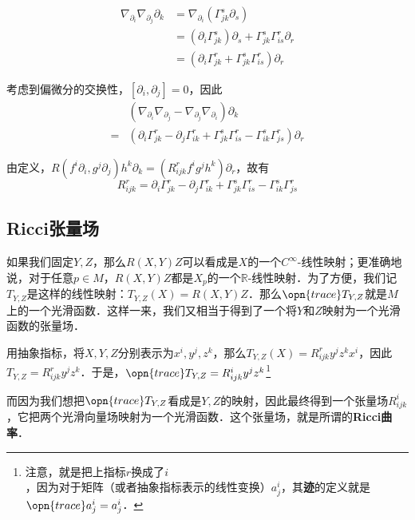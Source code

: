 \begin{equation}
\begin{aligned}
\nabla_{\partial_i}\nabla_{\partial_j}\partial_k&=\nabla_{\partial_i}(\Gamma^s_{jk}\partial_s)\\
&=(\partial_i\Gamma^s_{jk})\partial_s+\Gamma^s_{jk}\Gamma^r_{is}\partial_r\\
&=(\partial_i\Gamma^r_{jk}+\Gamma^s_{jk}\Gamma^r_{is})\partial_r
\end{aligned}
\end{equation}


考虑到偏微分的交换性，$[\partial_i, \partial_j]=0$，因此
\begin{equation}
\begin{aligned}
&(\nabla_{\partial_i}\nabla_{\partial_j}-\nabla_{\partial_j}\nabla_{\partial_i})\partial_k\\
=&(\partial_i\Gamma^r_{jk}-\partial_j\Gamma^{r}_{ik}+\Gamma^s_{jk}\Gamma^r_{is}-\Gamma^s_{ik}\Gamma^r_{js})\partial_r
\end{aligned}
\end{equation}

由定义，$R(f^i\partial_i, g^j\partial_j)h^k\partial_k=(R^r_{ijk}f^ig^jh^k)\partial_r$，故有
\begin{equation}
R^r_{ijk}=\partial_i\Gamma^r_{jk}-\partial_j\Gamma^{r}_{ik}+\Gamma^s_{jk}\Gamma^r_{is}-\Gamma^s_{ik}\Gamma^r_{js}
\end{equation}


\subsection{Ricci张量场}

如果我们固定$Y, Z$，那么$R(X, Y)Z$可以看成是$X$的一个$C^{\infty}$-线性映射；更准确地说，对于任意$p\in M$，$R(X, Y)Z$都是$X_p$的一个$\mathbb{R}$-线性映射．为了方便，我们记$T_{Y, Z}$是这样的线性映射：$T_{Y, Z}(X)=R(X, Y)Z$．那么$\opn{trace}T_{Y, Z}$就是$M$上的一个光滑函数．这样一来，我们又相当于得到了一个将$Y$和$Z$映射为一个光滑函数的张量场．

用抽象指标，将$X, Y, Z$分别表示为$x^i, y^j, z^k$，那么$T_{Y, Z}(X)=R^r_{ijk}y^jz^kx^i$，因此$T_{Y, Z}=R^r_{ijk}y^jz^k$．于是，$\opn{trace}T_{Y, Z}=R^i_{ijk}y^jz^k$\footnote{注意，就是把上指标$r$换成了$i$，因为对于矩阵（或者抽象指标表示的线性变换）$a^i_j$，其\textbf{迹}的定义就是$\opn{trace}a^i_j=a^i_j$．}

而因为我们想把$\opn{trace}T_{Y, Z}$看成是$Y, Z$的映射，因此最终得到一个张量场$R^i_{ijk}$，它把两个光滑向量场映射为一个光滑函数．这个张量场，就是所谓的\textbf{Ricci曲率}．

